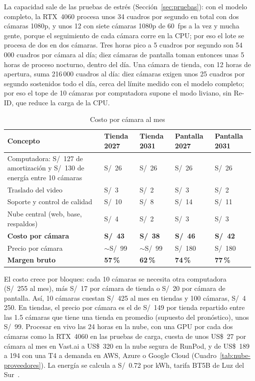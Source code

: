 \documentclass[12pt,a4paper]{article}
\begin{document}
La capacidad sale de las pruebas de estrés (Sección~\ref{sec:pruebas}): con
el modelo completo, la RTX~4060 procesa unos 34 cuadros por segundo en total
con dos cámaras 1080p, y unos 12 con siete cámaras 1080p de 60~fps a la vez
y mucha gente, porque el seguimiento de cada cámara corre en la CPU; por
eso el lote se procesa de dos en dos cámaras. Tres horas pico a 5 cuadros por
segundo son 54\,000 cuadros por cámara al día; diez cámaras de pantalla toman
entonces unas 5 horas de proceso nocturno, dentro del día. Una cámara de
tienda, con 12 horas de apertura, suma 216\,000 cuadros al día: diez cámaras
exigen unos 25 cuadros por segundo sostenidos todo el día, cerca del límite
medido con el modelo completo;
por eso el tope de 10 cámaras por computadora supone el modo liviano, sin Re-ID, que reduce la carga de la CPU.

\begin{table}[H]
\caption{Costo por cámara al mes}
\label{tab:costo-camara}
\centering
\footnotesize
\renewcommand{\arraystretch}{1.12}
\begin{tabular}{|L{0.36\textwidth}|R{0.12\textwidth}|R{0.12\textwidth}|R{0.12\textwidth}|R{0.12\textwidth}|}
\hline
\textbf{Concepto} & \textbf{Tienda 2027} & \textbf{Tienda 2031} & \textbf{Pantalla 2027} & \textbf{Pantalla 2031} \\
\hline
Computadora: S/~127 de amortización y S/~130 de energía entre 10 cámaras & S/~26 & S/~26 & S/~26 & S/~26 \\
\hline
Traslado del video & S/~3 & S/~2 & S/~3 & S/~2 \\
\hline
Soporte y control de calidad & S/~10 & S/~8 & S/~14 & S/~11 \\
\hline
Nube central (web, base, respaldos) & S/~4 & S/~2 & S/~3 & S/~3 \\
\hline
\textbf{Costo por cámara} & \textbf{S/~43} & \textbf{S/~38} & \textbf{S/~46} & \textbf{S/~42} \\
\hline
Precio por cámara & $\sim$S/~99 & $\sim$S/~99 & S/~180 & S/~180 \\
\hline
\textbf{Margen bruto} & \textbf{57\,\%} & \textbf{62\,\%} & \textbf{74\,\%} & \textbf{77\,\%} \\
\hline
\end{tabular}
\end{table}

El costo crece por bloques: cada 10 cámaras se necesita otra computadora
(S/~255 al mes), más S/~17 por cámara de tienda o S/~20 por cámara de pantalla.
Así, 10 cámaras cuestan S/~425 al mes en tiendas y 100 cámaras, S/~4\,250. En
tiendas, el precio por cámara es el de S/~149 por tienda repartido entre las
1.5 cámaras que tiene una tienda en promedio (supuesto del pronóstico), unos
S/~99. Procesar en vivo las 24 horas en la nube, con una GPU por cada dos cámaras como
la RTX~4060 en las pruebas de carga, cuesta de unos US\$~27 por cámara al mes
en Vast.ai a US\$~320 en la nube segura de RunPod, y de US\$~189 a 194 con una
T4 a demanda en AWS, Azure o Google Cloud (Cuadro~\ref{tab:nube-proveedores}). La energía se calcula a S/~0.72 por kWh, tarifa
BT5B de Luz del Sur~\cite{osinergmin}.
\end{document}
